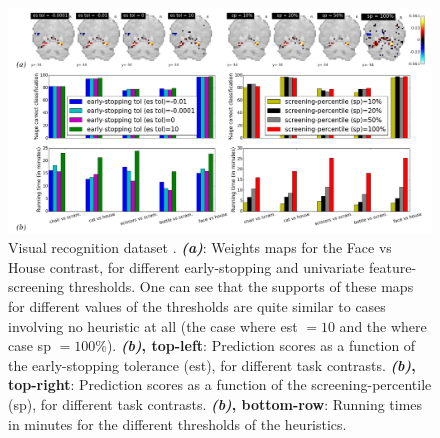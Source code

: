  \begin{figure}[!htb]
   \includegraphics[width=1\linewidth]{figures/screening_weights_haxby.png}
  \caption{Predicting age from gray-matter concentration maps from the
    OASIS dataset  \citep{marcus2007open}. \textbf{Top}:
    Weights maps (solutions to problem \eqref{eq:opt_pb}).
\textbf{Bottom-left}: Mean Square Error (MSE) in age prediction, for
different subjects of the validation set, for  varying levels of the
early-stopping tolerance (``es tol'' for short), with the
screening-percentile (sp) held constant at 100
(full-brain). \textbf{Bottom-right}: MSE in age prediction, for
varying levels of the screening-percentile (sp). \textbf{Running
  times}: Increasing \textit{est tol} (from $-10^{-4}$ to $10$): \textbf{100.2m, 171.4m, 188.8m, 289.6m}. For
increasing $sp$ ($10$ to $100$): \textbf{44.2m, 81.3m, 186.5m, 341.3m}}   
  \caption{Visual recognition dataset
     \citep{haxby2001}. \textbf{\textit{(a)}}: Weights maps
    for the Face vs House contrast,
    for different early-stopping and univariate feature-screening
    thresholds. One can see that the supports of these maps for
    different values of the thresholds are quite similar to cases
    involving  no heuristic at all (the case where est $= 10$ and the
    where case sp $=100\%$).
    \textbf{\textit{(b)}, top-left}: Prediction scores as a function of
    the early-stopping tolerance (est), for different task contrasts.
    \textbf{\textit{(b)}, top-right}: Prediction scores as a function of
    the screening-percentile (sp), for different task contrasts.
    \textbf{\textit{(b)}, bottom-row}: Running times in minutes for the
    different thresholds of the heuristics.
  }
  \label{fig:haxby}
\end{figure}
    
